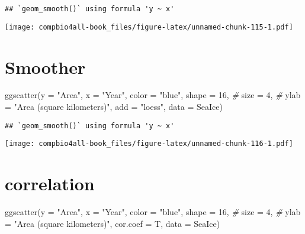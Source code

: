 \documentclass[
]{book}
\newenvironment{Shaded}{\begin{snugshade}}{\end{snugshade}}
\newcommand{\AttributeTok}[1]{\textcolor[rgb]{0.77,0.63,0.00}{#1}}
\newcommand{\CommentTok}[1]{\textcolor[rgb]{0.56,0.35,0.01}{\textit{#1}}}
\newcommand{\DecValTok}[1]{\textcolor[rgb]{0.00,0.00,0.81}{#1}}
\newcommand{\FunctionTok}[1]{\textcolor[rgb]{0.00,0.00,0.00}{#1}}
\newcommand{\NormalTok}[1]{#1}
\newcommand{\StringTok}[1]{\textcolor[rgb]{0.31,0.60,0.02}{#1}}
\begin{document}
\begin{verbatim}
## `geom_smooth()` using formula 'y ~ x'
\end{verbatim}

\texttt{[image: compbio4all-book\_files/figure-latex/unnamed-chunk-115-1.pdf]}

\hypertarget{smoother}{%
\section{Smoother}\label{smoother}}

\begin{Shaded}
\begin{Highlighting}[]
\FunctionTok{ggscatter}\NormalTok{(}\AttributeTok{y =} \StringTok{"Area"}\NormalTok{,}
          \AttributeTok{x =} \StringTok{"Year"}\NormalTok{,}
          \AttributeTok{color =} \StringTok{"blue"}\NormalTok{,}
          \AttributeTok{shape =} \DecValTok{16}\NormalTok{,     }\CommentTok{\# }
          \AttributeTok{size =} \DecValTok{4}\NormalTok{,       }\CommentTok{\# }
          \AttributeTok{ylab =} \StringTok{"Area (square kilometers)"}\NormalTok{, }
          \AttributeTok{add =} \StringTok{"loess"}\NormalTok{,}
          \AttributeTok{data =}\NormalTok{ SeaIce)}
\end{Highlighting}
\end{Shaded}

\begin{verbatim}
## `geom_smooth()` using formula 'y ~ x'
\end{verbatim}

\texttt{[image: compbio4all-book\_files/figure-latex/unnamed-chunk-116-1.pdf]}

\hypertarget{correlation}{%
\section{correlation}\label{correlation}}

\begin{Shaded}
\begin{Highlighting}[]
\FunctionTok{ggscatter}\NormalTok{(}\AttributeTok{y =} \StringTok{"Area"}\NormalTok{,}
          \AttributeTok{x =} \StringTok{"Year"}\NormalTok{,}
          \AttributeTok{color =} \StringTok{"blue"}\NormalTok{,}
          \AttributeTok{shape =} \DecValTok{16}\NormalTok{,     }\CommentTok{\# }
          \AttributeTok{size =} \DecValTok{4}\NormalTok{,       }\CommentTok{\# }
          \AttributeTok{ylab =} \StringTok{"Area (square kilometers)"}\NormalTok{,  }
          \AttributeTok{cor.coef =}\NormalTok{ T,}
          \AttributeTok{data =}\NormalTok{ SeaIce)}
\end{Highlighting}
\end{Shaded}
\end{document}
